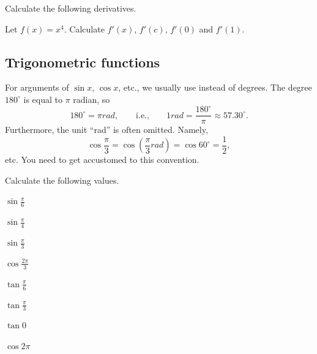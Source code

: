 \documentclass[11pt,pdfa,lastpage]{MishoNote}
\begin{document}
\begin{problems}
  \Problem[S] Calculate the following derivatives.
  \begin{menumerate}{3}
  \end{menumerate}
  \Problem[S] Let $f(x)=x^4$. Calculate $f'(x)$, $f'(c)$, $f'(0)$ and $f'(1)$.
\end{problems}

\subsection{Trigonometric functions}
For arguments of  $\sin x$, $\cos x$, etc., we usually use  instead of degrees. The degree $180^\circ$ is equal to $\pi$ radian, so
\begin{equation*}
  180^\circ = \pi\unit{rad},\qquad\text{i.e.,}\qquad 1\unit{rad}=\frac{180^\circ}\pi\approx57.30^\circ.
\end{equation*}
Furthermore, the unit ``rad'' is often omitted. Namely,
\begin{equation*}
  \cos\frac{\pi}{3} = \cos\left(\frac\pi3\unit{rad}\right) = \cos60^\circ = \frac12,
\end{equation*}
etc. You need to get accustomed to this convention.


\begin{problems}
  \Problem[S] Calculate the following values.
  \begin{menumerate}{4}
    \item $\displaystyle\sin\frac\pi6$
    \item $\displaystyle\sin\frac\pi4$
    \item $\displaystyle\sin\frac\pi3$
    \item $\displaystyle\cos\frac{2\pi}3$
    \item $\displaystyle\tan\frac\pi6$
    \item $\displaystyle\tan\frac{\pi}3$
    \item $\tan0$
    \item $\cos2\pi$
  \end{menumerate}
\end{problems}
\end{document}
